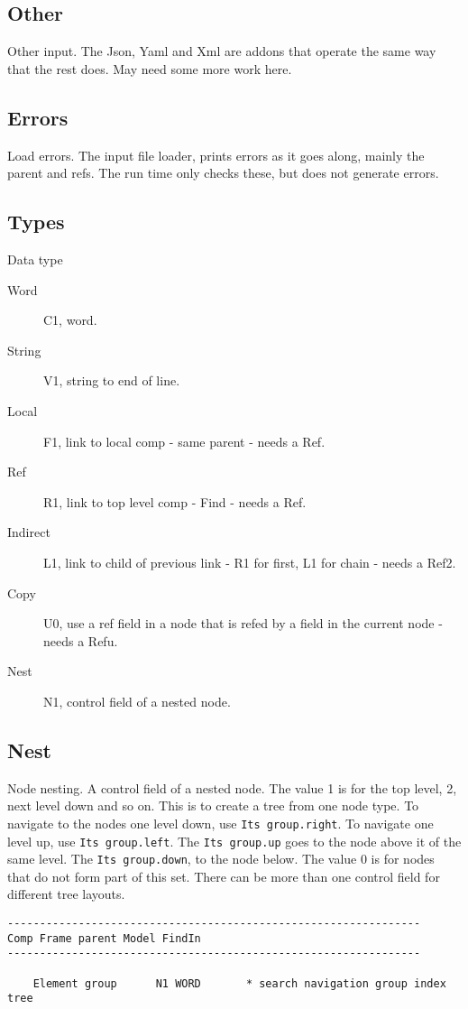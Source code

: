 \documentclass[11pt]{article}
\begin{document}
\subsection{Other}
Other input.
The Json, Yaml and Xml are addons that operate the same way that the
rest does. May need some more work here.

\subsection{Errors}
Load errors.
The input file loader, prints errors as it goes along, mainly the parent
and refs. The run time only checks these, but does not generate errors.

\subsection{Types}
Data type
\begin{description}
\item[Word] C1, word.
\item[String] V1, string to end of line.
\item[Local] F1, link to local comp - same parent - needs a Ref.
\item[Ref] R1, link to top level comp - Find - needs a Ref.
\item[Indirect] L1, link to child of previous link - R1 for first, L1 for chain - needs a Ref2.
\item[Copy] U0, use a ref field in a node that is refed by a field in the current node - needs a Refu.
\item[Nest] N1, control field of a nested node.
\end{description}
\subsection{Nest}
Node nesting.
A control field of a nested node. The value 1 is for the top level, 2,
next level down and so on. This is to create a tree from one node type.
To navigate to the nodes one level down, use \texttt{Its\ group.right}.
To navigate one level up, use \texttt{Its\ group.left}. The
\texttt{Its\ group.up} goes to the node above it of the same level. The
\texttt{Its\ group.down}, to the node below. The value 0 is for nodes
that do not form part of this set. There can be more than one control
field for different tree layouts.

\begin{verbatim}
----------------------------------------------------------------
Comp Frame parent Model FindIn
----------------------------------------------------------------

    Element group      N1 WORD       * search navigation group index tree
\end{verbatim}
\end{document}
